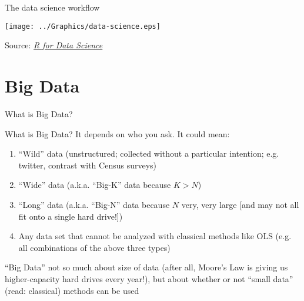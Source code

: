\documentclass[english,aspectratio=169,12pt,xcolor=dvipsnames]{beamer}
\begin{document}
\begin{frame}{The data science workflow}
\begin{center}
\texttt{[image: ../Graphics/data-science.eps]}
\end{center}
{\scriptsize Source: \href{{http://r4ds.had.co.nz/introduction.html}}{\emph{R for Data Science}}}
\end{frame}

\section{Big Data}
\begin{frame}{What is Big Data?}
\end{frame}


\begin{frame}{What is Big Data?}
It depends on who you ask. It could mean:
\begin{enumerate}
\item ``Wild'' data (unstructured; collected without a particular intention; e.g. twitter, contrast with Census surveys)
\item ``Wide'' data (a.k.a. ``Big-K'' data because $K>N$)
\item ``Long'' data (a.k.a. ``Big-N'' data because $N$ very, very large [and may not all fit onto a single hard drive!])
\item Any data set that cannot be analyzed with classical methods like OLS (e.g. all combinations of the above three types)
\end{enumerate}
``Big Data'' not so much about size of data (after all, Moore's Law is giving us higher-capacity hard drives every year!), but about whether or not ``small data'' (read: classical) methods can be used
\end{frame}
\end{document}
